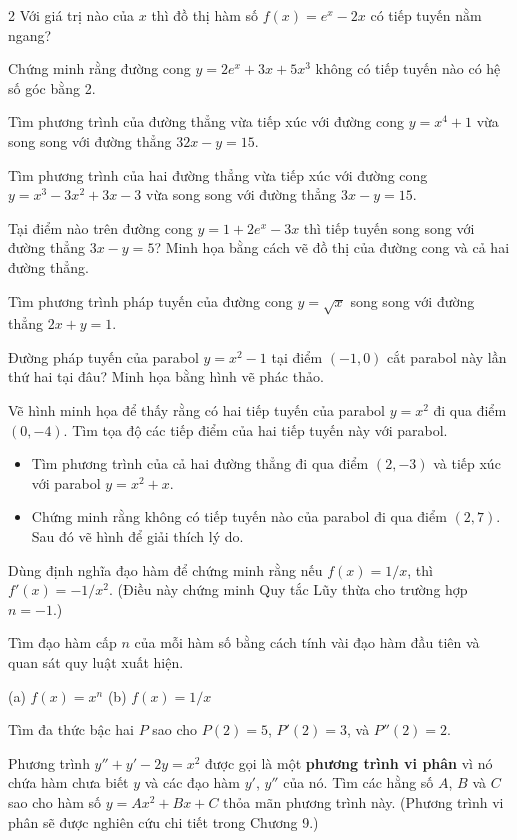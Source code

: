 \begin{multicols}{2}
 Với giá trị nào của $x$ thì đồ thị hàm số $f(x) = e^x - 2x$ có tiếp tuyến nằm ngang?

 Chứng minh rằng đường cong $y = 2e^x + 3x + 5x^3$ không có tiếp tuyến nào có hệ số góc bằng 2.

 Tìm phương trình của đường thẳng vừa tiếp xúc với đường cong $y = x^4 + 1$ vừa song song với đường thẳng $32x - y = 15$.

 Tìm phương trình của hai đường thẳng vừa tiếp xúc với đường cong $y = x^3 - 3x^2 + 3x - 3$ vừa song song với đường thẳng $3x - y = 15$.

\llap{\iconGraph\hspace{3pt}} Tại điểm nào trên đường cong $y = 1 + 2e^x - 3x$ thì tiếp tuyến song song với đường thẳng $3x - y = 5$? Minh họa bằng cách vẽ đồ thị của đường cong và cả hai đường thẳng.

 Tìm phương trình pháp tuyến của đường cong $y = \sqrt{x}$ song song với đường thẳng $2x + y = 1$.

 Đường pháp tuyến của parabol $y = x^2 - 1$ tại điểm $(-1, 0)$ cắt parabol này lần thứ hai tại đâu? Minh họa bằng hình vẽ phác thảo.

 Vẽ hình minh họa để thấy rằng có hai tiếp tuyến của parabol $y = x^2$ đi qua điểm $(0, -4)$. Tìm tọa độ các tiếp điểm của hai tiếp tuyến này với parabol.

\begin{itemize}[leftmargin=1.5em, itemsep=2pt, topsep=2pt, parsep=0pt]
  \item[(a)] Tìm phương trình của cả hai đường thẳng đi qua điểm $(2, -3)$ và tiếp xúc với parabol $y = x^2 + x$.
  \item[(b)] Chứng minh rằng không có tiếp tuyến nào của parabol đi qua điểm $(2, 7)$. Sau đó vẽ hình để giải thích lý do.
\end{itemize}

 Dùng định nghĩa đạo hàm để chứng minh rằng nếu $f(x) = 1/x$, thì $f'(x) = -1/x^2$. (Điều này chứng minh Quy tắc Lũy thừa cho trường hợp $n = -1$.)

\columnbreak

 Tìm đạo hàm cấp $n$ của mỗi hàm số bằng cách tính vài đạo hàm đầu tiên và quan sát quy luật xuất hiện.

(a) $f(x) = x^n$ \qquad\qquad (b) $f(x) = 1/x$

 Tìm đa thức bậc hai $P$ sao cho $P(2) = 5$, $P'(2) = 3$, và $P''(2) = 2$.

 Phương trình $y'' + y' - 2y = x^2$ được gọi là một \textbf{phương trình vi phân} vì nó chứa hàm chưa biết $y$ và các đạo hàm $y'$, $y''$ của nó. Tìm các hằng số $A$, $B$ và $C$ sao cho hàm số $y = Ax^2 + Bx + C$ thỏa mãn phương trình này. (Phương trình vi phân sẽ được nghiên cứu chi tiết trong Chương 9.)


\end{multicols}
